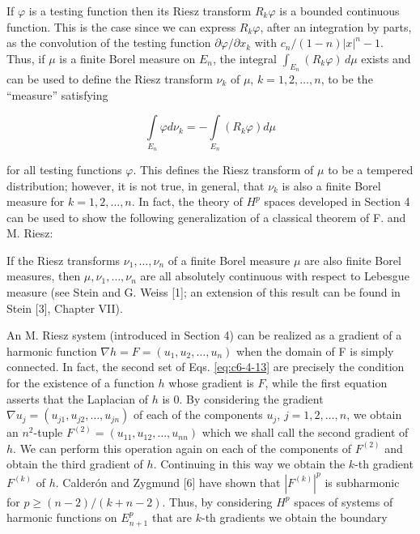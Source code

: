  If $\varphi$ is a testing function then its Riesz transform $R_k\varphi$ is a bounded continuous function. This is the case since we can express $R_k\varphi$, after an integration by parts, as the convolution of the testing function $\partial\varphi/\partial x_k$ with $c_n/(1-n)|x|^n-1$. Thus, if $\mu$ is a finite Borel measure on $E_n$, the integral $\int_{E_n}(R_k\varphi)\,d\mu$ exists and can be used to define the Riesz transform $\nu_k$ of $\mu$, $k=1,2,\ldots,n$, to be the ``measure'' satisfying

\[
\int\limits_{E_{n}}\varphi d\nu_{k}=-\int\limits_{E_{n}}(R_{k}\varphi)d\mu
\]

for all testing functions $\varphi$. This defines the Riesz transform of $\mu$ to be a tempered distribution; however, it is not true, in general, that $\nu_k$ is also a finite Borel measure for $k = 1, 2, \ldots, n$. In fact, the theory of $H^p$ spaces developed in Section 4 can be used to show the following generalization of a classical theorem of F. and M. Riesz:

If the Riesz transforms $\nu_1, \ldots, \nu_n$ of a finite Borel measure $\mu$ are also finite Borel measures, then $\mu, \nu_1, \ldots, \nu_n$ are all absolutely continuous with respect to Lebesgue measure (see Stein and G. Weiss [1]; an extension of this result can be found in Stein [3], Chapter VII).

 An M. Riesz system (introduced in Section 4) can be realized as a gradient of a harmonic function $\nabla h = F = (u_1, u_2, \ldots, u_n)$ when the domain of F is simply connected. In fact, the second set of Eqs. \eqref{eq:c6-4-13} are precisely the condition for the existence of a function $h$ whose gradient is $F$, while the first equation asserts that the Laplacian of $h$ is 0. By considering the gradient $\nabla u_j = (u_{j1}, u_{j2}, \ldots, u_{jn})$ of each of the components $u_j$, $j = 1, 2, \ldots, n$, we obtain an $n^2$-tuple $F^{(2)} = (u_{11}, u_{12}, \ldots, u_{nn})$ which we shall call the second gradient of $h$. We can perform this operation again on each of the components of $F^{(2)}$ and obtain the third gradient of $h$. Continuing in this way we obtain the $k$-th gradient $F^{(k)}$ of $h$. Calderón and Zygmund [6] have shown that $|F^{(k)}|^p$ is subharmonic for $p \geq (n-2)/(k+n-2)$. Thus, by considering $H^p$ spaces of systems of harmonic functions on $E_{n+1}^p$ that are $k$-th gradients we obtain the boundary

